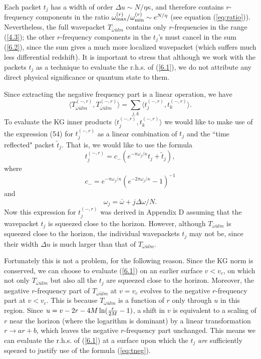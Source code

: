 \documentclass[12pt]{article}
\def\o{\omega}
\def\obar{\bar{\omega}}
\def\ubar{\bar{u}}
\def\la{\langle}
\def\ra{\rangle}
\begin{document}
Each packet $t_j$ has a width of order $\Delta u\sim N/\eta\kappa$,
and therefore contains $r$-frequency components in the ratio
$\o^{(r)}_{\rm max}/\o^{(r)}_{\rm min}\sim e^{N/\eta}$ (see equation
(\ref{eq:ratio})). Nevertheless, the full wavepacket
$T_{\obar\ubar lm}$
contains only $r$-frequencies in the range (\ref{4.3});
the other $r$-frequency components in the $t_j$'s must
cancel in the sum
(\ref{6.2}), since the sum gives a much more localized wavepacket
(which suffers much less differential redshift).
It is important to stress that although we work with the packets
$t_j$ as a technique to evaluate the r.h.s. of (\ref{6.1}), we do
not attribute any direct physical significance or quantum
state to them.

Since extracting the negative frequency part is a linear
operation, we have
\begin{equation} \la T^{\scriptscriptstyle(-,r)}_{\obar\ubar lm},
T^{\scriptscriptstyle(-,r)}_{\obar\ubar lm}\ra=
\sum_{j,k}\la t^{\scriptscriptstyle (-,r)}_j,
t^{\scriptscriptstyle (-,r)}_k\ra.
\label{6.4}
\end{equation}
To evaluate the KG inner products
$\la t^{\scriptscriptstyle (-,r)}_j,
t^{\scriptscriptstyle (-,r)}_k\ra$
we would like to make use of the expression (54) for
$t^{\scriptscriptstyle (-,r)}_j$ as a linear combination of
$t_j$ and the ``time reflected" packet $\widetilde {t}_j$.
That is, we would like to use the formula
\begin{equation}
t^{\scriptscriptstyle(-,r)}_j=c_{-}
(e^{-\pi\o_j/\kappa}t_j+\widetilde{t}_j),
\label{eq:tneg}
\end{equation}
where
\begin{equation}
c_{-}=
e^{-\pi\o_j/\kappa}(e^{-2\pi\o_j/\kappa}-1)^{-1}
\end{equation}
and
\begin{equation}
\o_j=\obar+j\Delta\o/N.
\end{equation}
Now this expression for $t^{\scriptscriptstyle(-,r)}_j$
was derived in Appendix D assuming that the wavepacket
$t_j$ is squeezed close to the horizon. However, although
$T_{\obar\ubar lm}$ is squeezed close to the horizon, the
individual wavepackets $t_j$ may not be, since their width
$\Delta u$ is much larger than that of $T_{\obar\ubar lm}$.

Fortunately this is not a problem, for the following reason.
Since the KG norm is conserved, we can choose to evaluate
(\ref{6.1}) on an earlier surface $v<v_c$, on which not only
$T_{\obar\ubar lm}$ but also all the $t_j$ are squeezed
close to the horizon. Moreover, the negative $r$-frequency
part of $T_{\obar\ubar lm}$ at $v=v_c$ evolves to the
negative $r$-frequency part at $v<v_c$. This is because
$T_{\obar\ubar lm}$ is a function of $r$ only through $u$
in this region. Since $u=v-2r-4M\ln({r\over 2M}-1)$,
a shift in $v$ is equivalent to a scaling of $r$ near the
horizon (where the logarithm is dominant)
by a linear transformation $r\rightarrow ar+b$,
which leaves the negative
$r$-frequency part unchanged. This means we can evaluate the
r.h.s. of (\ref{6.1}) at a surface upon which the $t_j$ {\it are}
sufficiently sqeezed to justify use of the formula
(\ref{eq:tneg}).
\end{document}

